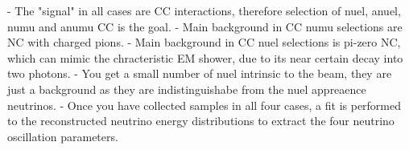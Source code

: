- The "signal" in all cases are CC interactions, therefore selection of nuel, anuel, numu and
anumu CC is the goal.
- Main background in CC numu selections are NC with charged pions.
- Main background in CC nuel selections is pi-zero NC, which can mimic the chracteristic EM
shower, due to its near certain decay into two photons.
- You get a small number of nuel intrinsic to the beam, they are just a background as they are
indistinguishabe from the nuel appreaence neutrinos.
- Once you have collected samples in all four cases, a fit is performed to the reconstructed
neutrino energy distributions to extract the four neutrino oscillation parameters.